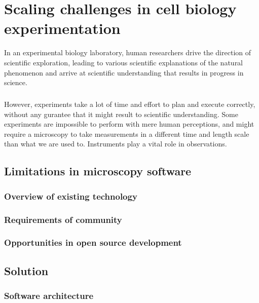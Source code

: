 \chapter{Scaling challenges in cell biology experimentation}
In an experimental biology laboratory, human researchers drive the direction of scientific exploration, leading to various scientific explanations of the natural phenomenon and arrive at scientific understanding that results in progress in science.

\paragraph*{} However, experiments take a lot of time and effort to plan and execute correctly, without any gurantee that it might result to scientific understanding. Some experiments are impossible to perform with mere human perceptions, and might require a microscopy to take measurements in a different time and length scale than what we are used to. Instruments play a vital role in observations.

\paragraph*{}
\paragraph*{}


\section{Limitations in microscopy software}
\subsection{Overview of existing technology}
\subsection{Requirements of community}
\subsection{Opportunities in open source development}
\section{Solution}
\subsection{Software architecture}
